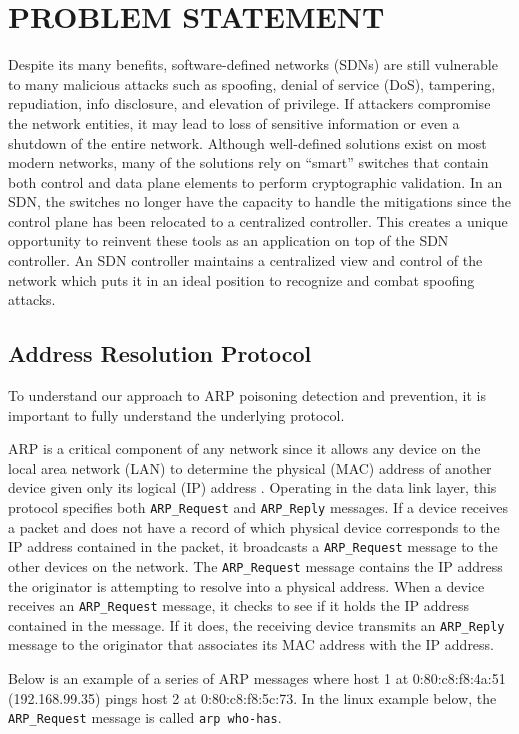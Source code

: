 \documentclass[conference]{IEEEtran}
\begin{document}
\section{PROBLEM STATEMENT}
Despite its many benefits, software-defined networks (SDNs) are still vulnerable to many malicious attacks such as spoofing, denial of service (DoS), tampering, repudiation, info disclosure, and elevation of privilege. If attackers compromise the network entities, it may lead to loss of sensitive information or even a shutdown of the entire network. Although well-defined solutions exist on most modern networks, many of the solutions rely on “smart” switches that contain both control and data plane elements to perform cryptographic validation. In an SDN, the switches no longer have the capacity to handle the mitigations since the control plane has been relocated to a centralized controller. This creates a unique opportunity to reinvent these tools as an application on top of the SDN controller. An SDN controller maintains a centralized view and control of the network which puts it in an ideal position to recognize and combat spoofing attacks.

\subsection{Address Resolution Protocol}
To understand our approach to ARP poisoning detection and prevention, it is important to fully understand the underlying protocol.

ARP is a critical component of any network since it allows any device on the local area network (LAN) to determine the physical (MAC) address of another device given only its logical (IP) address \cite{b10}. Operating in the data link layer, this protocol specifies both \texttt{ARP\_Request} and \texttt{ARP\_Reply} messages. If a device receives a packet and does not have a record of which physical device corresponds to the IP address contained in the packet, it broadcasts a \texttt{ARP\_Request} message to the other devices on the network. The \texttt{ARP\_Request} message contains the IP address the originator is attempting to resolve into a physical address. When a device receives an \texttt{ARP\_Request} message, it checks to see if it holds the IP address contained in the message. If it does, the receiving device transmits an \texttt{ARP\_Reply} message to the originator that associates its MAC address with the IP address.

Below is an example of a series of ARP messages where host 1 at 0:80:c8:f8:4a:51 (192.168.99.35) pings host 2 at 0:80:c8:f8:5c:73. In the linux example below, the \texttt{ARP\_Request} message is called \texttt{arp who-has}.
\end{document}
